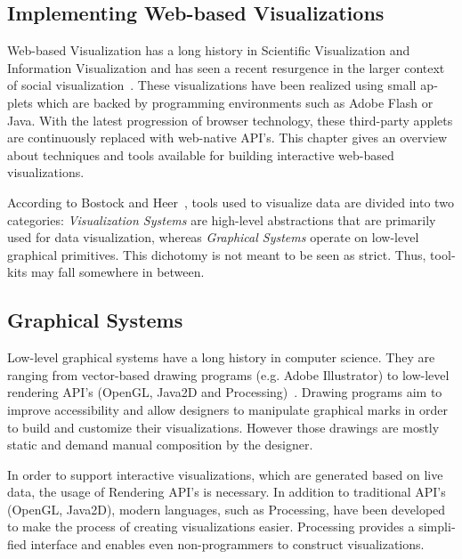 \begin{english}

\chapter{Implementing Web-based Visualizations}
\label{cha:web_based_visualization}

Web-based Visualization has a long history in Scientific Visualization and Information Visualization and has seen a recent resurgence in the larger context of social visualization~\cite{Johnson08}. These visualizations have been realized using small applets which are backed by programming environments such as Adobe Flash or Java. With the latest progression of browser technology, these third-party applets are continuously replaced with web-native API's. This chapter gives an overview about techniques and tools available for building interactive web-based visualizations.

According to Bostock and Heer~\cite{Protovis09}, tools used to visualize data are divided into two categories: 
\emph{Visualization Systems} are high-level abstractions that are primarily used for data visualization, whereas \emph{Graphical Systems} operate on low-level graphical primitives. This dichotomy is not meant to be seen as strict. Thus, toolkits may fall somewhere in between.

\section{Graphical Systems}

Low-level graphical systems have a long history in computer science. They are ranging from vector-based drawing programs (e.g. Adobe Illustrator) to low-level rendering API's (OpenGL, Java2D and Processing)~\cite{Protovis09}. Drawing programs aim to improve accessibility and allow designers to manipulate graphical marks in order to build and customize their visualizations. However those drawings are mostly static and demand manual composition by the designer.

In order to support interactive visualizations, which are generated based on live data, the usage of Rendering API's is necessary. In addition to traditional API's (OpenGL, Java2D), modern languages, such as Processing, have been developed to make the process of creating visualizations easier. Processing provides a simplified interface and enables even non-programmers to construct visualizations.


\end{english}
